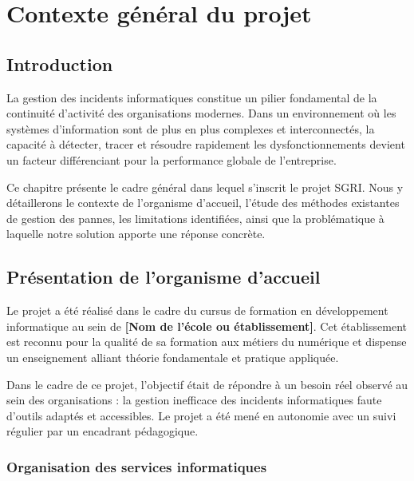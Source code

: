 \documentclass[12pt,a4paper,twoside]{report}
\begin{document}
\chapter{Contexte général du projet}

\section{Introduction}

La gestion des incidents informatiques constitue un pilier fondamental de la continuité d'activité des organisations modernes. Dans un environnement où les systèmes d'information sont de plus en plus complexes et interconnectés, la capacité à détecter, tracer et résoudre rapidement les dysfonctionnements devient un facteur différenciant pour la performance globale de l'entreprise.

Ce chapitre présente le cadre général dans lequel s'inscrit le projet SGRI. Nous y détaillerons le contexte de l'organisme d'accueil, l'étude des méthodes existantes de gestion des pannes, les limitations identifiées, ainsi que la problématique à laquelle notre solution apporte une réponse concrète.

\section{Présentation de l'organisme d'accueil}

Le projet a été réalisé dans le cadre du cursus de formation en développement informatique au sein de \textbf{[Nom de l'école ou établissement]}. Cet établissement est reconnu pour la qualité de sa formation aux métiers du numérique et dispense un enseignement alliant théorie fondamentale et pratique appliquée.

Dans le cadre de ce projet, l'objectif était de répondre à un besoin réel observé au sein des organisations : la gestion inefficace des incidents informatiques faute d'outils adaptés et accessibles. Le projet a été mené en autonomie avec un suivi régulier par un encadrant pédagogique.

\subsection{Organisation des services informatiques}
\end{document}
